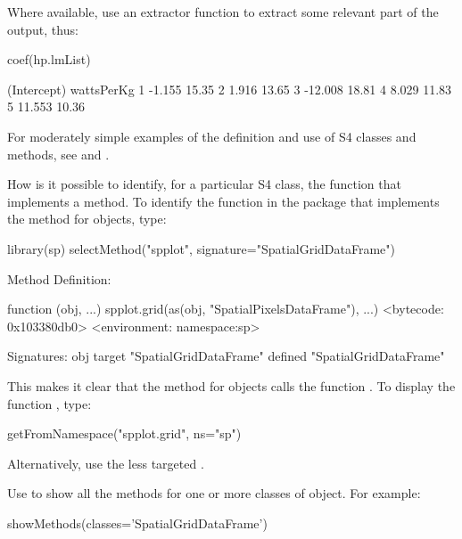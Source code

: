 Where available, use an extractor function to extract some relevant
part of the output, thus:
\begin{Schunk}
\begin{Sinput}
coef(hp.lmList)
\end{Sinput}
\begin{Soutput}
  (Intercept) wattsPerKg
1      -1.155      15.35
2       1.916      13.65
3     -12.008      18.81
4       8.029      11.83
5      11.553      10.36
\end{Soutput}
\end{Schunk}

For moderately simple examples of the definition and use of S4 classes
and methods, see  and .

How is it possible to identify, for a particular S4 class, the
function that implements a method.  To identify the function
in the  package that implements the  method
for  objects, type:
\begin{Schunk}
\begin{Sinput}
library(sp)
selectMethod("spplot",
             signature="SpatialGridDataFrame")
\end{Sinput}
\begin{Soutput}
Method Definition:

function (obj, ...) 
spplot.grid(as(obj, "SpatialPixelsDataFrame"), ...)
<bytecode: 0x103380db0>
<environment: namespace:sp>

Signatures:
        obj                   
target  "SpatialGridDataFrame"
defined "SpatialGridDataFrame"
\end{Soutput}
\end{Schunk}
This makes it clear that the  method for
 objects calls the function
. To display the function ,
type:
\begin{Schunk}
\begin{Sinput}
getFromNamespace("spplot.grid", ns="sp")
\end{Sinput}
\end{Schunk}
\noindent
Alternatively, use the less targeted
.

Use  to show all the methods for one or more
classes of object.  For example:
\begin{Schunk}
\begin{Sinput}
showMethods(classes='SpatialGridDataFrame')
\end{Sinput}
\end{Schunk}

